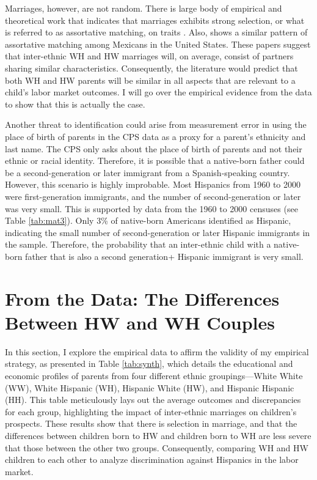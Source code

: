 Marriages, however, are not random. There is large body of empirical and theoretical work that indicates that marriages exhibits strong selection, or what is referred to as assortative matching, on traits \autocite{averettBetterWorseRelationship2008, averettEconomicRealityBeauty1996, beckerTheoryMarriagePart1973, beckerTheoryMarriagePart1974, beckerTreatiseFamily1993, browningCollectiveUnitaryModels2006, chiapporiFatterAttractionAnthropometric2012}. Also, \textcite{duncanIntermarriageIntergenerationalTransmission2011} shows a similar pattern of assortative matching among Mexicans in the United States. These papers suggest that inter-ethnic WH and HW marriages will, on average, consist of partners sharing similar characteristics. Consequently, the literature would predict that both WH and HW parents will be similar in all aspects that are relevant to a child's labor market outcomes. I will go over the empirical evidence from the data to show that this is actually the case.

Another threat to identification could arise from measurement error in using the place of birth of parents in the CPS data as a proxy for a parent's ethnicity and last name. The CPS only asks about the place of birth of parents and not their ethnic or racial identity. Therefore, it is possible that a native-born father could be a second-generation or later immigrant from a Spanish-speaking country. However, this scenario is highly improbable. Most Hispanics from 1960 to 2000 were first-generation immigrants, and the number of second-generation or later was very small. This is supported by data from the 1960 to 2000 censuses (see Table \ref{tab:mat3}). Only 3\% of native-born Americans identified as Hispanic, indicating the small number of second-generation or later Hispanic immigrants in the sample. Therefore, the probability that an inter-ethnic child with a native-born father that is also a second generation+ Hispanic immigrant is very small.

\section{From the Data: The Differences Between HW and WH Couples}\label{sec:hw-wh-couples-data}

In this section, I explore the empirical data to affirm the validity of my empirical strategy, as presented in Table \ref{tab:synth}, which details the educational and economic profiles of parents from four different ethnic groupings—White White (WW), White Hispanic (WH), Hispanic White (HW), and Hispanic Hispanic (HH). This table meticulously lays out the average outcomes and discrepancies for each group, highlighting the impact of inter-ethnic marriages on children's prospects. These results show that there is selection in marriage, and that the differences between children born to HW and children born to WH are less severe that those between the other two groups. Consequently, comparing WH and HW children to each other to analyze discrimination against Hispanics in the labor market.


